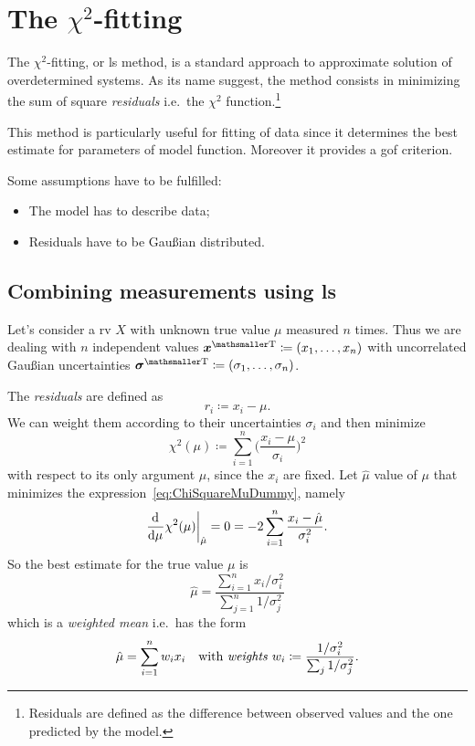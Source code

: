 \documentclass[
	10pt,
	draft
]{scrreprt}
\newcommand{\transpose}[1]{\ensuremath{#1}^{\mathrm{ \mathsmaller T}}}
\newcommand{\deriv}[3][]{\dfrac{\ud^{#1}#2}{\ud #3^{#1}}}%
\begin{document}
	\section{The $\chi^2$-fitting}

The $\chi^2$-fitting, or \ac{ls} method, is a standard approach to approximate solution of overdetermined systems.
As its name suggest, the method consists in minimizing the sum of square \emph{residuals} i.e.~the $\chi^2$ function.\footnote{Residuals are defined as the difference between observed values and the one predicted by the model.}


This method is particularly useful for fitting of data since it determines the best estimate for parameters of model function.
Moreover it provides a \ac{gof} criterion.


Some assumptions have to be fulfilled:
\begin{itemize}
	\item
The model has to describe data;
	\item
Residuals have to be Gau\ss{}ian distributed.
\end{itemize}

		\subsection{Combining measurements using \acs{ls}}

Let's consider a \ac{rv} $X$ with unknown true value $\mu$ measured $n$ times.
Thus we are dealing with $n$ independent values $\transpose{\vec{x} } \coloneqq (x_1,\dots,x_n)$ with uncorrelated Gau\ss{}ian uncertainties $\transpose{\vec{\sigma}} \coloneqq (\sigma_1,\dots,\sigma_n)$.


The \emph{residuals} are defined as
\begin{equation}
r_i \coloneqq x_i-\mu.
\end{equation}
We can weight them according to their uncertainties $\sigma_i$ and then minimize
\begin{equation}\label{eq:ChiSquareMuDummy}
\chi^2(\mu) \coloneqq \sum_{i=1}^n \biggl(\frac{x_i - \mu}{\sigma_i}\biggr)^2
\end{equation}
with respect to its only argument $\mu$, since the $x_i$ are fixed.
Let $\hat \mu$ value of $\mu$ that minimizes the expression~\eqref{eq:ChiSquareMuDummy}, namely
\begin{equation}
\deriv{}{\mu}\chi^2(\mu)\bigg\rvert_{\hat\mu} = 0 = -2\sum_{i=1}^n \frac{x_i-\hat\mu}{\sigma_i^2}.
\end{equation}
So the best estimate for the true value $\mu$ is
\begin{equation}
\hat\mu = \frac{\sum_{i=1}^n x_i/\sigma_i^2}{\sum_{j=1}^n 1/\sigma_j^2}
\end{equation}
which is a \emph{weighted mean} i.e.~has the form
\begin{equation}
\hat\mu = \sum_{i=1}^n w_ix_i
\quad
\text{with \emph{weights}\index{weight} }
w_i \coloneqq \frac{1/\sigma_i^2}{\sum_{j}1/\sigma_j^2}.
\end{equation}
\end{document}
